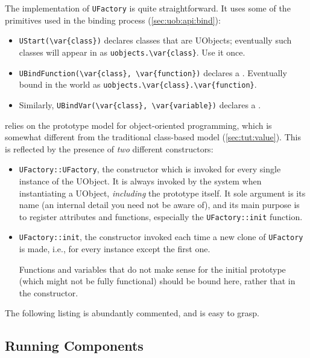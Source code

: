 The implementation of \lstinline|UFactory| is quite straightforward.
It uses some of the primitives used in the binding process
(\autoref{sec:uob:api:bind}):
\begin{itemize}
\item \lstinline|UStart(\var{class})| declares classes that are
  UObjects; eventually such classes will appear in \us as
  \lstinline|uobjects.\var{class}|.  Use it once.

\item \lstinline|UBindFunction(\var{class}, \var{function})| declares
  a .  Eventually bound in the \us world as
  \lstinline|uobjects.\var{class}.\var{function}|.

\item Similarly, \lstinline|UBindVar(\var{class}, \var{variable})|
  declares a .
\end{itemize}

\urbi relies on the prototype model for object-oriented programming,
which is somewhat different from the traditional \Cxx class-based
model (\autoref{sec:tut:value}).  This is reflected by the presence of
\emph{two} different constructors:
\begin{itemize}
\item \lstinline|UFactory::UFactory|, the \Cxx constructor which is
  invoked for every single instance of the UObject.  It is always
  invoked by the \urbi system when instantiating a UObject,
  \emph{including} the prototype itself.  It sole argument is its name
  (an internal detail you need not be aware of), and its main purpose
  is to register attributes and functions, especially the
  \lstinline|UFactory::init| function.

\item \lstinline|UFactory::init|, the \urbi constructor invoked each
  time a new clone of \lstinline|UFactory| is made, i.e., for every
  instance except the first one.

  Functions and variables that do not make sense for the initial
  prototype (which might not be fully functional) should be bound
  here, rather that in the \Cxx constructor.
\end{itemize}

The following listing is abundantly commented, and is easy to grasp.



\subsection{Running Components}
\label{sec:uob:quick:run}
%


